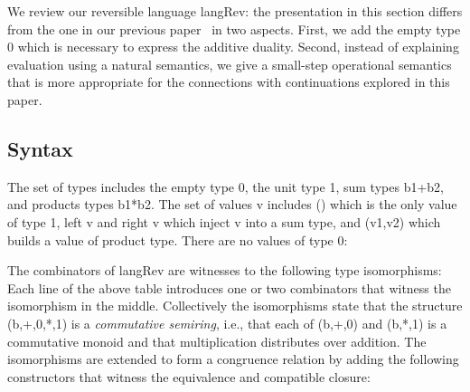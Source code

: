 \documentclass[preprint]{sigplanconf}
\begin{document}
We review our reversible language {{langRev}}: the presentation in this
section differs from the one in our previous paper~\cite{infeffects} in two
aspects. First, we add the empty type $0$ which is necessary to express the
additive duality. Second, instead of explaining evaluation using a natural
semantics, we give a small-step operational semantics that is more
appropriate for the connections with continuations explored in this paper.

\subsection{Syntax} 

The set of types includes the empty type {{0}}, the unit type {{1}}, sum
types {{b1+b2}}, and products types {{b1*b2}}. The set of values {{v}}
includes {{()}} which is the only value of type {{1}}, {{left v}} and {{right v}} 
which inject {{v}} into a sum type, and {{(v1,v2)}} which builds a
value of product type. There are no values of type {{0}}:

The combinators of {{langRev}} are witnesses to the following type
isomorphisms: 
Each line of the above table introduces one or two combinators that witness
the isomorphism in the middle. Collectively the isomorphisms state that the
structure {{(b,+,0,*,1)}} is a \emph{commutative semiring}, i.e., that each
of {{(b,+,0)}} and {{(b,*,1)}} is a commutative monoid and that
multiplication distributes over addition. The isomorphisms are extended to
form a congruence relation by adding the following constructors that witness
the equivalence and compatible closure:
%
%
%
\end{document}
